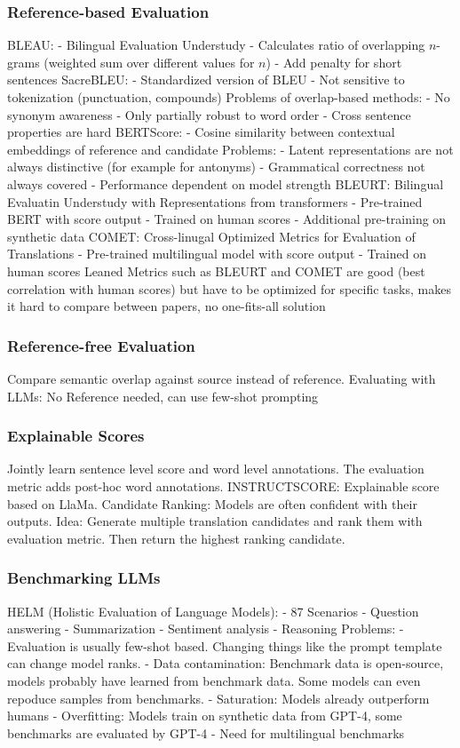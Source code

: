 \documentclass{scrartcl}
\begin{document}
\subsubsection*{Reference-based Evaluation}
BLEAU:
- Bilingual Evaluation Understudy
- Calculates ratio of overlapping $n$-grams (weighted sum over different values for $n$)
- Add penalty for short sentences
SacreBLEU:
- Standardized version of BLEU
- Not sensitive to tokenization (punctuation, compounds)
Problems of overlap-based methods:
- No synonym awareness
- Only partially robust to word order
- Cross sentence properties are hard
BERTScore:
- Cosine similarity between contextual embeddings of reference and candidate
Problems:
- Latent representations are not always distinctive (for example for antonyms)
- Grammatical correctness not always covered
- Performance dependent on model strength
BLEURT: Bilingual Evaluatin Understudy with Representations from transformers
- Pre-trained BERT with score output
- Trained on human scores
- Additional pre-training on synthetic data
COMET: Cross-linugal Optimized Metrics for Evaluation of Translations
- Pre-trained multilingual model with score output
- Trained on human scores
Leaned Metrics such as BLEURT and COMET are good (best correlation with human scores) but have to be optimized for specific tasks, makes it hard to compare between papers, no one-fits-all solution

\subsubsection*{Reference-free Evaluation}
Compare semantic overlap against source instead of reference.
Evaluating with LLMs: No Reference needed, can use few-shot prompting

\subsubsection*{Explainable Scores}
Jointly learn sentence level score and word level annotations. The evaluation metric adds post-hoc word annotations.
INSTRUCTSCORE: Explainable score based on LlaMa.
Candidate Ranking: Models are often confident with their outputs. Idea: Generate multiple translation candidates and rank them with evaluation metric. Then return the highest ranking candidate.

\subsubsection*{Benchmarking LLMs}
HELM (Holistic Evaluation of Language Models):
- 87 Scenarios
- Question answering
- Summarization
- Sentiment analysis
- Reasoning
Problems:
- Evaluation is usually few-shot based. Changing things like the prompt template can change model ranks.
- Data contamination: Benchmark data is open-source, models probably have learned from benchmark data. Some models can even repoduce samples from benchmarks.
- Saturation: Models already outperform humans
- Overfitting: Models train on synthetic data from GPT-4, some benchmarks are evaluated by GPT-4
- Need for multilingual benchmarks
\end{document}
